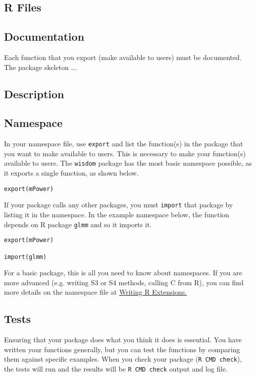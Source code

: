 \documentclass{article}
\begin{document}
\subsection{R Files} 

\subsection{Documentation}
Each function that you export (make available to users) must be documented. The package skeleton ...
\subsection{Description}
\subsection{Namespace} In your namespace file, use  \texttt{export} and list the function(s) in the package that you want to make available to users. This is necessary to make your function(s) available to users. The  \texttt{wisdom} package has the most basic namespace possible, as it exports a single function, as shown below.

\begin{verbatim}
export(mPower)
\end{verbatim}

If your package calls any other packages, you must \texttt{import} that package by listing it in the namespace. In the example namespace below, the function depends on R package \texttt{glmm} and so it imports it.

\begin{verbatim}
export(mPower)

import(glmm)
\end{verbatim}

For a basic package, this is all you need to know about namespaces. If you are more advanced (e.g. writing S3 or S4 methods, calling C from R), you can find more details on the namespace file at  \href{https://cran.r-project.org/doc/manuals/R-exts.html#Package-namespaces}{Writing R Extensions.}

\subsection{Tests} Ensuring that your package does what you think it does is essential. You have written your functions generally, but you can test the functions by comparing them against specific examples. When you check your package (\texttt{R CMD check}), the tests will run and the results will be  \texttt{R CMD check} output and log file.\\
\end{document}
